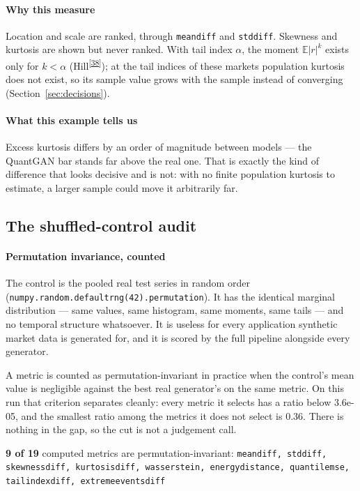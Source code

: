 \documentclass[11pt,a4paper]{article}
\makeatletter
\newcommand{\tcite}[1]{\textsuperscript{[\hyperlink{R:#1}{#1}]}}
\DeclareRobustCommand{\_}{\ifmmode\nfss@text{\textunderscore}\else\textunderscore\allowbreak\fi}
\newcommand{\E}{\mathbb{E}}
\makeatother
\begin{document}
\paragraph{Why this measure} Location and scale are ranked, through \texttt{mean\_diff} and \texttt{std\_diff}. Skewness and kurtosis are shown but never ranked. With tail index $\alpha$, the moment $\E|r|^k$ exists only for $k<\alpha$ (Hill\tcite{38}); at the tail indices of these markets population kurtosis does not exist, so its sample value grows with the sample instead of converging (Section~\ref{sec:decisions}).

\paragraph{What this example tells us} Excess kurtosis differs by an order of magnitude between models --- the QuantGAN bar stands far above the real one. That is exactly the kind of difference that looks decisive and is not: with no finite population kurtosis to estimate, a larger sample could move it arbitrarily far.

\subsection{The shuffled-control audit}
\label{sec:audit}

\paragraph{Permutation invariance, counted} The control is the pooled real test series in random order (\texttt{numpy.random.default\_rng(42).permutation}). It has the identical marginal distribution --- same values, same histogram, same moments, same tails --- and no temporal structure whatsoever. It is useless for every application synthetic market data is generated for, and it is scored by the full pipeline alongside every generator.

A metric is counted as permutation-invariant in practice when the control's mean value is negligible against the best real generator's on the same metric. On this run that criterion separates cleanly: every metric it selects has a ratio below 3.6e-05, and the smallest ratio among the metrics it does not select is 0.36. There is nothing in the gap, so the cut is not a judgement call.

\textbf{9 of 19} computed metrics are permutation-invariant:
{\footnotesize\texttt{mean\_diff, std\_diff, skewness\_diff, kurtosis\_diff, wasserstein, energy\_distance, quantile\_mse, tail\_index\_diff, extreme\_events\_diff}}
\end{document}
